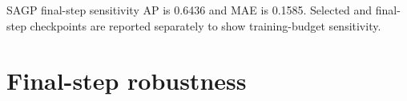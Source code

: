 \documentclass[letterpaper]{article}
\begin{document}


SAGP final-step sensitivity AP is 0.6436 and MAE is 0.1585. Selected and final-step checkpoints are reported separately to show training-budget sensitivity.

\section{Final-step robustness}



\end{document}
